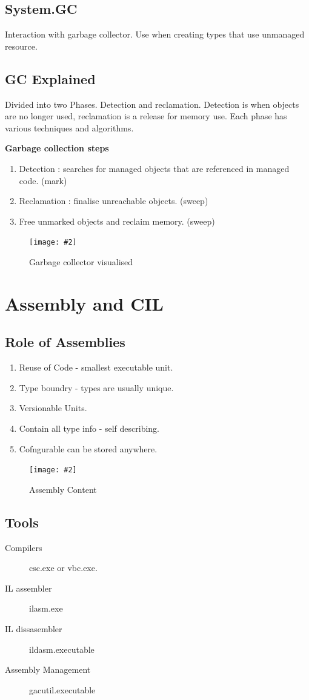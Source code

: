 \documentclass[a4paper,10pt]{scrartcl}
\newcommand{\pic}[2][Figure]{
  \begin{figure}[h!]
   \centering
   \texttt{[image: \#2]}
   \caption{{#1}}
  \end{figure}
}
\begin{document}
\subsection{System.GC}
Interaction with garbage collector. Use when creating types that use unmanaged resource.

\subsection{GC Explained}
Divided into two Phases. Detection and reclamation. Detection is when objects are no longer used, reclamation is a release for memory use.
Each phase has various techniques and algorithms.

\textbf{Garbage collection steps}
\begin{enumerate}
 \item Detection : searches for managed objects that are referenced in managed code. (mark)
 \item Reclamation :  finalise unreachable objects. (sweep)
 \item Free unmarked objects and reclaim memory. (sweep)
\end{enumerate}
\pic[Garbage collector visualised]{gcvisual.png}

\section{Assembly and CIL}
\subsection{Role of Assemblies}
\begin{enumerate}
 \item Reuse of Code - smallest executable unit.
 \item Type boundry - types are usually unique.
 \item Versionable Units.
 \item Contain all type info - self describing.
 \item Cofngurable can be stored anywhere. 
 
\end{enumerate}
\pic[Assembly Content]{asmcontent.png}

\subsection{Tools}
\begin{description}
 \item [Compilers] csc.exe or vbc.exe.
 \item [IL assembler] ilasm.exe
 \item [IL dissasembler] ildasm.executable
 \item [Assembly Management] gacutil.executable
\end{description}
\end{document}
